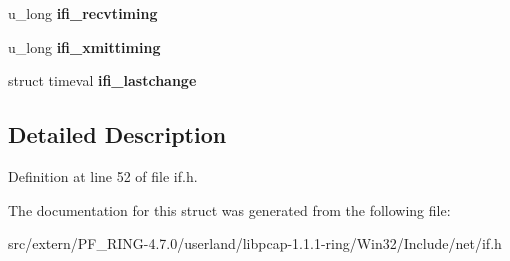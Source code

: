 \begin{DoxyCompactItemize}
\item 
\hypertarget{structif__data_af8b71f675838d3d3e29e75fd4a691308}{
u\_\-long {\bfseries ifi\_\-recvtiming}}
\label{structif__data_af8b71f675838d3d3e29e75fd4a691308}

\item 
\hypertarget{structif__data_aa72342555a65bc9926f8e0ce61c6268f}{
u\_\-long {\bfseries ifi\_\-xmittiming}}
\label{structif__data_aa72342555a65bc9926f8e0ce61c6268f}

\item 
\hypertarget{structif__data_a755ac240b124e6a06e2ce90eaf06add2}{
struct timeval {\bfseries ifi\_\-lastchange}}
\label{structif__data_a755ac240b124e6a06e2ce90eaf06add2}

\end{DoxyCompactItemize}


\subsection{Detailed Description}


Definition at line 52 of file if.h.



The documentation for this struct was generated from the following file:\begin{DoxyCompactItemize}
\item 
src/extern/PF\_\-RING-\/4.7.0/userland/libpcap-\/1.1.1-\/ring/Win32/Include/net/if.h\end{DoxyCompactItemize}

